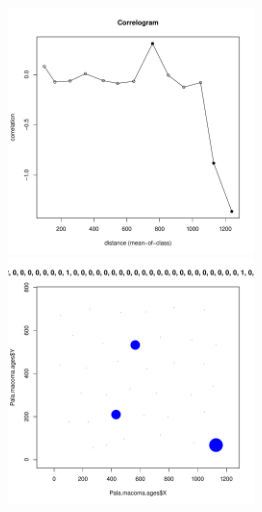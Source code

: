 \begin{figure}[h]
	\begin{minipage}[b]{.46\linewidth}
	\begin{center}
		\includegraphics[width=65mm]{../Barenc_Sea/distribution_Moran/Pala_macoma_age_N14_.pdf}
	\end{center}
	\end{minipage}
	\hfil %
	\begin{minipage}[b]{.46\linewidth}
	\begin{center}
		\includegraphics[width=65mm]{../Barenc_Sea/distribution_Moran/Pala_macoma_age_bubb_N14_.pdf}
	\end{center}
	\end{minipage}

	\end{figure}
